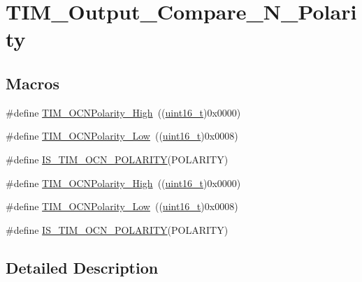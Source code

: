 \hypertarget{group___t_i_m___output___compare___n___polarity}{}\section{T\+I\+M\+\_\+\+Output\+\_\+\+Compare\+\_\+\+N\+\_\+\+Polarity}
\label{group___t_i_m___output___compare___n___polarity}
\subsection*{Macros}
\begin{DoxyCompactItemize}
\item 
\#define \hyperlink{group___t_i_m___output___compare___n___polarity_gaa62288888d4f6858bee6b3cd9086ae3f}{T\+I\+M\+\_\+\+O\+C\+N\+Polarity\+\_\+\+High}~((\hyperlink{_p_e___types_8h_a1f1825b69244eb3ad2c7165ddc99c956}{uint16\+\_\+t})0x0000)
\item 
\#define \hyperlink{group___t_i_m___output___compare___n___polarity_ga9582560b2e7dae2e8dc3b65909b0c9cf}{T\+I\+M\+\_\+\+O\+C\+N\+Polarity\+\_\+\+Low}~((\hyperlink{_p_e___types_8h_a1f1825b69244eb3ad2c7165ddc99c956}{uint16\+\_\+t})0x0008)
\item 
\#define \hyperlink{group___t_i_m___output___compare___n___polarity_gad7385dee1d2b6ce0daf23ceaac4439cd}{I\+S\+\_\+\+T\+I\+M\+\_\+\+O\+C\+N\+\_\+\+P\+O\+L\+A\+R\+I\+TY}(P\+O\+L\+A\+R\+I\+TY)
\item 
\#define \hyperlink{group___t_i_m___output___compare___n___polarity_gaa62288888d4f6858bee6b3cd9086ae3f}{T\+I\+M\+\_\+\+O\+C\+N\+Polarity\+\_\+\+High}~((\hyperlink{_p_e___types_8h_a1f1825b69244eb3ad2c7165ddc99c956}{uint16\+\_\+t})0x0000)
\item 
\#define \hyperlink{group___t_i_m___output___compare___n___polarity_ga9582560b2e7dae2e8dc3b65909b0c9cf}{T\+I\+M\+\_\+\+O\+C\+N\+Polarity\+\_\+\+Low}~((\hyperlink{_p_e___types_8h_a1f1825b69244eb3ad2c7165ddc99c956}{uint16\+\_\+t})0x0008)
\item 
\#define \hyperlink{group___t_i_m___output___compare___n___polarity_gad7385dee1d2b6ce0daf23ceaac4439cd}{I\+S\+\_\+\+T\+I\+M\+\_\+\+O\+C\+N\+\_\+\+P\+O\+L\+A\+R\+I\+TY}(P\+O\+L\+A\+R\+I\+TY)
\end{DoxyCompactItemize}


\subsection{Detailed Description}


